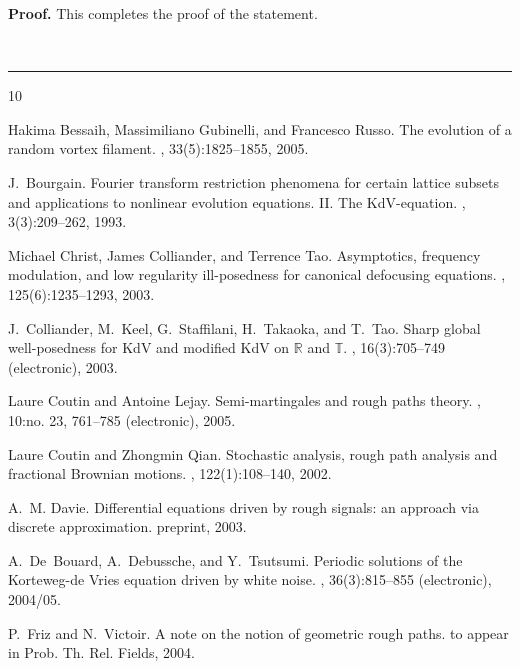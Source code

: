 \documentclass[a4paper,12pt,reqno]{article}
\newenvironment{proof}[1][Proof]{\textbf{#1.} }{\ \rule{0.5em}{0.5em}}
\begin{document}
\begin{proof}
This completes the proof of the statement.

\end{proof}


%
%


\begin{thebibliography}{10}

Hakima Bessaih, Massimiliano Gubinelli, and Francesco Russo.
\newblock The evolution of a random vortex filament.
, 33(5):1825--1855, 2005.

J.~Bourgain.
\newblock Fourier transform restriction phenomena for certain lattice subsets
  and applications to nonlinear evolution equations. {II}. {T}he
  {K}d{V}-equation.
, 3(3):209--262, 1993.

Michael Christ, James Colliander, and Terrence Tao.
\newblock Asymptotics, frequency modulation, and low regularity ill-posedness
  for canonical defocusing equations.
, 125(6):1235--1293, 2003.

J.~Colliander, M.~Keel, G.~Staffilani, H.~Takaoka, and T.~Tao.
\newblock Sharp global well-posedness for {K}d{V} and modified {K}d{V} on
  {$\mathbb{R}$} and {$\mathbb{T}$}.
, 16(3):705--749 (electronic), 2003.

Laure Coutin and Antoine Lejay.
\newblock Semi-martingales and rough paths theory.
, 10:no. 23, 761--785 (electronic), 2005.

Laure Coutin and Zhongmin Qian.
\newblock Stochastic analysis, rough path analysis and fractional {B}rownian
  motions.
, 122(1):108--140, 2002.

A.~M. Davie.
\newblock Differential equations driven by rough signals: an approach via
  discrete approximation.
\newblock preprint, 2003.

A.~De~Bouard, A.~Debussche, and Y.~Tsutsumi.
\newblock Periodic solutions of the {K}orteweg-de {V}ries equation driven by
  white noise.
, 36(3):815--855 (electronic), 2004/05.

P.~Friz and N.~Victoir.
\newblock A note on the notion of geometric rough paths.
\newblock to appear in Prob. Th. Rel. Fields, 2004.


\end{thebibliography}
\end{document}
